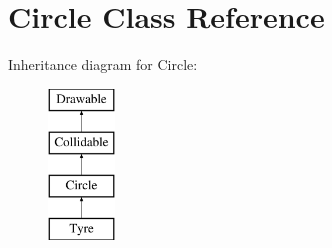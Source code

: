 \hypertarget{class_circle}{}\section{Circle Class Reference}
\label{class_circle}
Inheritance diagram for Circle\+:\begin{figure}[H]
\begin{center}
\leavevmode
\includegraphics[height=4.000000cm]{class_circle}
\end{center}
\end{figure}
